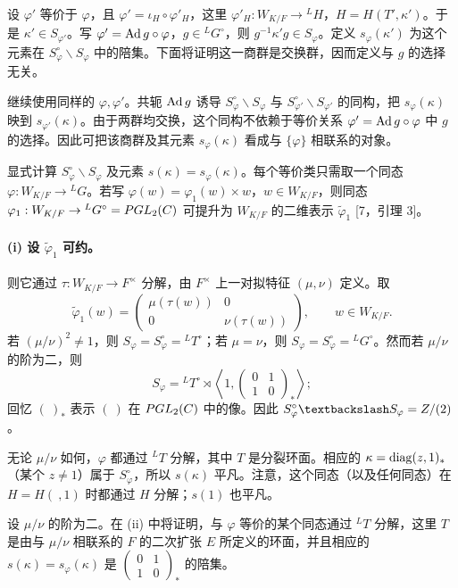 设 $\varphi'$ 等价于 $\varphi$，且 $\varphi'=\iota_H\circ\varphi'_H$，这里
$\varphi'_H:W_{K/F}\to{}^LH$，$H=H(T',\kappa')$。于是
$\kappa'\in S_{\varphi'}$。写 $\varphi'=\Ad g\circ\varphi$，$g\in{}^LG^\circ$，则
$g^{-1}\kappa'g\in S_\varphi$。定义 $s_\varphi(\kappa')$ 为这个元素在
$S_\varphi^\circ\backslash S_\varphi$ 中的陪集。下面将证明这一商群是交换群，因而定义与 $g$ 的选择无关。

继续使用同样的 $\varphi,\varphi'$。共轭 $\Ad g$ 诱导
$S_\varphi^\circ\backslash S_\varphi$ 与
$S_{\varphi'}^\circ\backslash S_{\varphi'}$ 的同构，把
$s_\varphi(\kappa)$ 映到 $s_{\varphi'}(\kappa)$。由于两群均交换，这个同构不依赖于等价关系 $\varphi'=\Ad g\circ\varphi$ 中 $g$ 的选择。因此可把该商群及其元素 $s_\varphi(\kappa)$ 看成与 $\{\varphi\}$ 相联系的对象。

显式计算 $S_\varphi^\circ\backslash S_\varphi$ 及元素
$s(\kappa)=s_\varphi(\kappa)$。每个等价类只需取一个同态
$\varphi:W_{K/F}\to{}^LG$。若写
$\varphi(w)=\varphi_1(w)\times w$，$w\in W_{K/F}$，则同态
$\varphi_1:W_{K/F}\to{}^LG^\circ=PGL_2(C)$ 可提升为
$W_{K/F}$ 的二维表示 $\widetilde\varphi_1$ [7，引理 3]。

\paragraph*{(i) 设 $\widetilde\varphi_1$ 可约。}
则它通过 $\tau:W_{K/F}\to F^\times$ 分解，由 $F^\times$ 上一对拟特征
$(\mu,\nu)$ 定义。取
\[
\widetilde\varphi_1(w)=\begin{pmatrix}\mu(\tau(w))&0\\0&\nu(\tau(w))\end{pmatrix},
\qquad w\in W_{K/F}.
\]
若 $(\mu/\nu)^2\ne1$，则 $S_\varphi=S_\varphi^\circ={}^LT^\circ$；若 $\mu=\nu$，则
$S_\varphi=S_\varphi^\circ={}^LG^\circ$。然而若 $\mu/\nu$ 的阶为二，则
\[
S_\varphi={}^LT^\circ\rtimes
\left\langle1,\begin{pmatrix}0&1\\1&0\end{pmatrix}_*\right\rangle;
\]
回忆 $(\ )_*$ 表示 $(\ )$ 在 $PGL_2(C)$ 中的像。因此
$S_\varphi^\circ\backslash S_\varphi=\Z/(2)$。

无论 $\mu/\nu$ 如何，$\varphi$ 都通过 ${}^LT$ 分解，其中 $T$ 是分裂环面。相应的 $\kappa=\diag(z,1)_*$（某个 $z\ne1$）属于
$S_\varphi^\circ$，所以 $s(\kappa)$ 平凡。注意，这个同态（以及任何同态）在 $H=H(\ ,1)$ 时都通过 $H$ 分解；$s(1)$ 也平凡。

设 $\mu/\nu$ 的阶为二。在 (ii) 中将证明，与 $\varphi$ 等价的某个同态通过 ${}^LT$ 分解，这里 $T$ 是由与 $\mu/\nu$ 相联系的 $F$ 的二次扩张 $E$ 所定义的环面，并且相应的 $s(\kappa)=s_\varphi(\kappa)$ 是
$\begin{pmatrix}0&1\\1&0\end{pmatrix}_*$ 的陪集。

